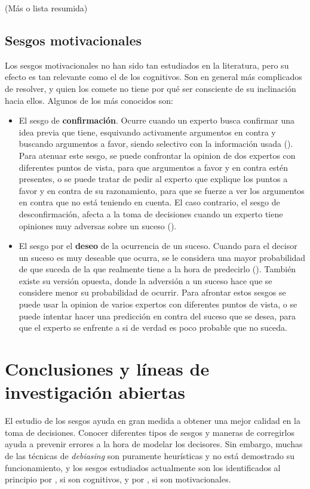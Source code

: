 \documentclass[a4paper,11pt]{article}
\begin{document}
(Más o lista resumida)
\subsection{Sesgos motivacionales}
Los sesgos motivacionales no han sido tan estudiados en la literatura, pero su efecto es tan relevante como el de los cognitivos. Son en general más complicados de resolver, y quien los comete no tiene por qué ser consciente de su inclinación hacia ellos. Algunos de los más conocidos son:

\begin{itemize}

\item El sesgo de \textbf{confirmación}. Ocurre cuando un experto busca confirmar una idea previa que tiene, esquivando activamente argumentos en contra y buscando argumentos a favor, siendo selectivo con la información usada (\cite{correia2011}). Para atenuar este sesgo, se puede confrontar la opinion de dos expertos con diferentes puntos de vista, para que argumentos a favor y en contra estén presentes, o se puede tratar de pedir al experto que explique los puntos a favor y en contra de su razonamiento, para que se fuerze a ver los argumentos en contra que no está teniendo en cuenta. El caso contrario, el sesgo de desconfirmación, afecta a la toma de decisiones cuando un experto tiene opiniones muy adversas sobre un suceso (\cite{taber2009}).

\item El sesgo por el \textbf{deseo} de la ocurrencia de un suceso. Cuando para el decisor un suceso es muy deseable que ocurra, se le considera una mayor probabilidad de que suceda de la que realmente tiene a la hora de predecirlo (\cite{krizan2007}). También existe su versión opuesta, donde la adversión a un suceso hace que se considere menor su probabilidad de ocurrir. Para afrontar estos sesgos se puede usar la opinion de varios expertos con diferentes puntos de vista, o se puede intentar hacer una predicción en contra del suceso que se desea, para que el experto se enfrente a si de verdad es poco probable que no suceda.

\end{itemize}

\section{Conclusiones y líneas de investigación abiertas}

El estudio de los sesgos ayuda en gran medida a obtener una mejor calidad en la toma de decisiones. Conocer diferentes tipos de sesgos y maneras de corregirlos ayuda a prevenir errores a la hora de modelar los decisores. Sin embargo, muchas de las técnicas de \textit{debiasing} son puramente heurísticas y no está demostrado su funcionamiento, y los sesgos estudiados actualmente son los identificados al principio por \cite{tversky1974}, si son cognitivos, y por \cite{kunda1990}, si son motivacionales.
\end{document}
